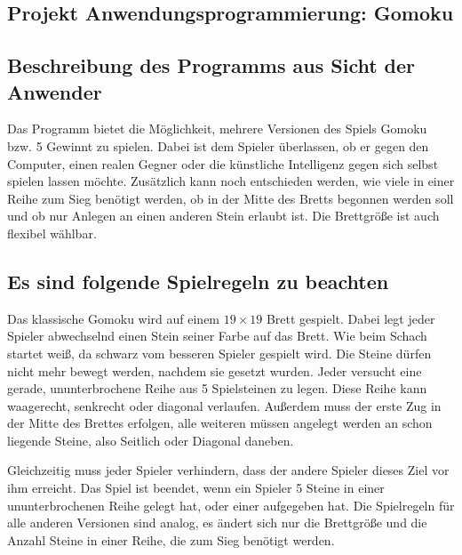 \documentclass[11pt]{article}
\newcommand{\1}{{\mathds{1}}}
\begin{document}
	\pagestyle{fancy}

	\arraycolsep=1.0pt
	
	\begin{center}
		\section*{Projekt Anwendungsprogrammierung: Gomoku}
	\end{center}
	
	\subsection*{Beschreibung des Programms aus Sicht der Anwender}
	
	Das Programm bietet die Möglichkeit, mehrere Versionen des Spiels Gomoku bzw. 5 Gewinnt zu spielen.
	Dabei ist dem Spieler überlassen, ob er gegen den Computer, einen realen Gegner oder die künstliche Intelligenz gegen sich selbst spielen lassen möchte.
	Zusätzlich kann noch entschieden werden, wie viele in einer Reihe zum Sieg benötigt werden, 
	ob in der Mitte des Bretts begonnen werden soll und ob nur Anlegen an einen anderen Stein erlaubt ist.
	Die Brettgröße ist auch flexibel wählbar.
	
	\subsection*{Es sind folgende Spielregeln zu beachten}
	Das klassische Gomoku wird auf einem $19 \times 19$ Brett gespielt.
	Dabei legt jeder Spieler abwechselnd einen Stein seiner Farbe auf das Brett.
	Wie beim Schach startet weiß, da schwarz vom besseren Spieler gespielt wird.
	Die Steine dürfen nicht mehr bewegt werden, nachdem sie gesetzt wurden.
	Jeder versucht eine gerade, ununterbrochene Reihe aus 5 Spielsteinen zu legen.
	Diese Reihe kann waagerecht, senkrecht oder diagonal verlaufen. 
	Außerdem muss der erste Zug in der Mitte des Brettes erfolgen, alle weiteren müssen angelegt werden an schon liegende Steine, also Seitlich oder Diagonal daneben.
	
	Gleichzeitig muss jeder Spieler verhindern, dass der andere Spieler dieses Ziel vor ihm erreicht.
	Das Spiel ist beendet, wenn ein Spieler 5 Steine in einer ununterbrochenen Reihe gelegt hat, oder einer aufgegeben hat.
	Die Spielregeln für alle anderen Versionen sind analog, es ändert sich nur die Brettgröße und die Anzahl Steine in einer Reihe, die zum Sieg benötigt werden. 
	
\end{document}
